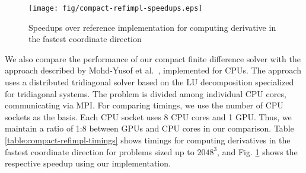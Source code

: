 
%
\begin{figure}
\begin{center}
\texttt{[image: fig/compact-refimpl-speedups.eps]}
\caption{Speedups over reference implementation
    for computing derivative in the fastest coordinate direction}
\label{fig:compact-refimpl-speedups}
\end{center}
\end{figure}

We also compare the performance of our compact finite difference
solver with the approach described by
Mohd-Yusof et al.\ \cite{mohd2010adapting},
implemented for CPUs.
The approach uses a distributed tridiagonal solver based on
the LU decomposition specialized for tridiagonal systems.
The problem is divided among individual CPU cores,
communicating via MPI.
For comparing timings,
we use the number of CPU sockets as the basis.
Each CPU socket uses 8 CPU cores and 1 GPU.
Thus, we maintain a ratio of 1:8 between GPUs and CPU cores
in our comparison.
Table \ref{table:compact-refimpl-timings}
shows timings for computing derivatives
in the fastest coordinate direction
for problems sized up to $2048^3$,
and Fig. \ref{fig:compact-refimpl-speedups}
shows the respective speedup using our implementation.
